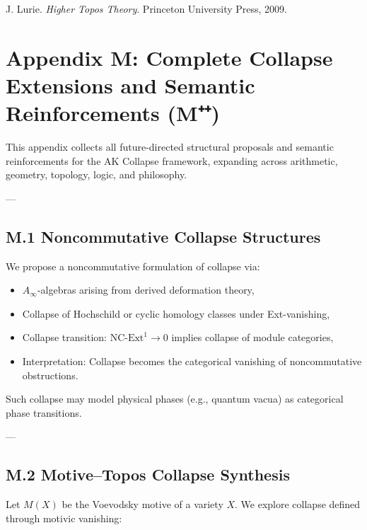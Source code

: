 \documentclass[11pt]{article}
\begin{document}
\begin{axiom}
\begin{axiom}
{{\begin{thebibliography}{9}
J. Lurie.  
\textit{Higher Topos Theory}. Princeton University Press, 2009.

\end{thebibliography}




\section*{Appendix M: Complete Collapse Extensions and Semantic Reinforcements (M⁺⁺)}

This appendix collects all future-directed structural proposals and semantic reinforcements  
for the AK Collapse framework, expanding across arithmetic, geometry, topology, logic, and philosophy.

---

\subsection*{M.1 Noncommutative Collapse Structures}

We propose a noncommutative formulation of collapse via:

\begin{itemize}
  \item $A_\infty$-algebras arising from derived deformation theory,
  \item Collapse of Hochschild or cyclic homology classes under Ext-vanishing,
  \item Collapse transition: $\text{NC-Ext}^1 \to 0$ implies collapse of module categories,
  \item Interpretation: Collapse becomes the categorical vanishing of noncommutative obstructions.
\end{itemize}

Such collapse may model physical phases (e.g., quantum vacua) as categorical phase transitions.

---

\subsection*{M.2 Motive–Topos Collapse Synthesis}

Let $M(X)$ be the Voevodsky motive of a variety $X$.  
We explore collapse defined through motivic vanishing:

}}
\end{axiom}
\end{axiom}
\end{document}
